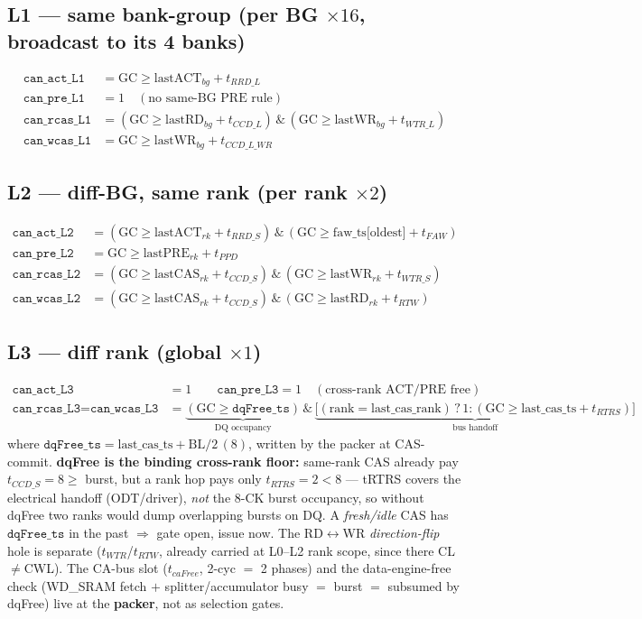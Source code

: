 \documentclass[10pt]{article}
\newcommand{\p}[1]{\texttt{#1}}
\begin{document}
\subsection{L1 — same bank-group (per BG $\times16$, broadcast to its 4 banks)}
\begin{align*}
\p{can\_act\_L1}  &= \text{GC}\ge \text{lastACT}_{bg}+t_{RRD\_L}\\
\p{can\_pre\_L1}  &= 1 \quad(\text{no same-BG PRE rule})\\
\p{can\_rcas\_L1} &= (\text{GC}\ge \text{lastRD}_{bg}+t_{CCD\_L}) \,\&\, (\text{GC}\ge \text{lastWR}_{bg}+t_{WTR\_L})\\
\p{can\_wcas\_L1} &= \text{GC}\ge \text{lastWR}_{bg}+t_{CCD\_L\_WR}
\end{align*}

\subsection{L2 — diff-BG, same rank (per rank $\times2$)}
\begin{align*}
\p{can\_act\_L2}  &= (\text{GC}\ge \text{lastACT}_{rk}+t_{RRD\_S}) \,\&\, (\text{GC}\ge \text{faw\_ts[oldest]}+t_{FAW})\\
\p{can\_pre\_L2}  &= \text{GC}\ge \text{lastPRE}_{rk}+t_{PPD}\\
\p{can\_rcas\_L2} &= (\text{GC}\ge \text{lastCAS}_{rk}+t_{CCD\_S}) \,\&\, (\text{GC}\ge \text{lastWR}_{rk}+t_{WTR\_S})\\
\p{can\_wcas\_L2} &= (\text{GC}\ge \text{lastCAS}_{rk}+t_{CCD\_S}) \,\&\, (\text{GC}\ge \text{lastRD}_{rk}+t_{RTW})
\end{align*}

\subsection{L3 — diff rank (global $\times1$)}
\begin{align*}
\p{can\_act\_L3}  &= 1 \qquad \p{can\_pre\_L3} = 1 \quad(\text{cross-rank ACT/PRE free})\\
\p{can\_rcas\_L3} = \p{can\_wcas\_L3} &= \underbrace{(\text{GC}\ge \p{dqFree\_ts})}_{\text{DQ occupancy}} \,\&\, \underbrace{\big[(\text{rank}{=}\text{last\_cas\_rank})\,?\,1:(\text{GC}\ge \text{last\_cas\_ts}+t_{RTRS})\big]}_{\text{bus handoff}}
\end{align*}
\noindent where $\p{dqFree\_ts}=\text{last\_cas\_ts}+\text{BL}/2\,(8)$, written by the packer at
CAS-commit. \textbf{dqFree is the binding cross-rank floor:} same-rank CAS already pay
$t_{CCD\_S}=8\ge$ burst, but a rank hop pays only $t_{RTRS}=2<8$ — tRTRS covers the electrical
handoff (ODT/driver), \emph{not} the 8-CK burst occupancy, so without dqFree two ranks would dump
overlapping bursts on DQ. A \emph{fresh/idle} CAS has $\p{dqFree\_ts}$ in the past $\Rightarrow$
gate open, issue now. The RD$\leftrightarrow$WR \emph{direction-flip} hole is separate
($t_{WTR}$/$t_{RTW}$, already carried at L0--L2 rank scope, since there CL$\ne$CWL). The CA-bus
slot ($t_{caFree}$, 2-cyc $=$ 2 phases) and the data-engine-free check (WD\_SRAM fetch $+$
splitter/accumulator busy $=$ burst $=$ subsumed by dqFree) live at the \textbf{packer}, not as
selection gates.
\end{document}
